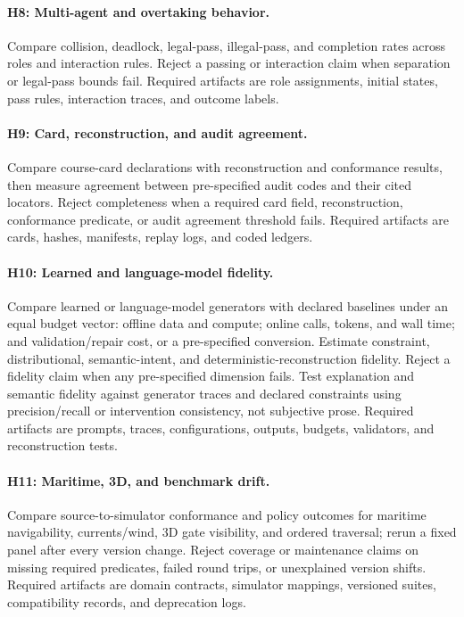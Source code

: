 \paragraph{H8: Multi-agent and overtaking behavior.}
Compare collision, deadlock, legal-pass, illegal-pass, and completion rates across
roles and interaction rules. Reject a passing or interaction claim when separation or
legal-pass bounds fail. Required artifacts are role assignments, initial states, pass
rules, interaction traces, and outcome labels.

\paragraph{H9: Card, reconstruction, and audit agreement.}
Compare course-card declarations with reconstruction and conformance results, then
measure agreement between pre-specified audit codes and their cited locators. Reject
completeness when a required card field, reconstruction, conformance predicate, or
audit agreement threshold fails. Required artifacts are cards, hashes, manifests,
replay logs, and coded ledgers.

\paragraph{H10: Learned and language-model fidelity.}
Compare learned or language-model generators with declared baselines under an equal
budget vector: offline data and compute; online calls, tokens, and wall time; and
validation/repair cost, or a pre-specified conversion. Estimate constraint,
distributional, semantic-intent, and deterministic-reconstruction fidelity. Reject a
fidelity claim when any pre-specified dimension fails. Test explanation and semantic
fidelity against generator traces and declared constraints using precision/recall or
intervention consistency, not subjective prose. Required artifacts are prompts,
traces, configurations, outputs, budgets, validators, and reconstruction tests.

\paragraph{H11: Maritime, 3D, and benchmark drift.}
Compare source-to-simulator conformance and policy outcomes for maritime navigability,
currents/wind, 3D gate visibility, and ordered traversal; rerun a fixed panel after
every version change. Reject coverage or maintenance claims on missing required
predicates, failed round trips, or unexplained version shifts. Required artifacts are
domain contracts, simulator mappings, versioned suites, compatibility records, and
deprecation logs.
